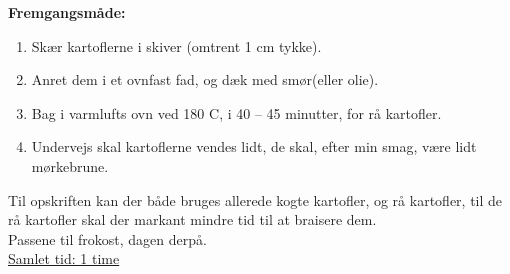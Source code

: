 \documentclass{book}
\begin{document}
\begin{minipage}[t]{0.5\textwidth}
\textbf{Fremgangsmåde:}
\begin{enumerate}
    \item Skær kartoflerne i skiver (omtrent 1 cm tykke).
\item Anret dem i et ovnfast fad, og dæk med smør(eller olie).
\item Bag i varmlufts ovn ved 180 \degree C, i 40 – 45 minutter, for rå kartofler.
\item Undervejs skal kartoflerne vendes lidt, de skal, efter min smag, være lidt mørkebrune.
\end{enumerate}
\end{minipage}
Til opskriften kan der både bruges allerede kogte kartofler, og rå kartofler, til de rå kartofler skal der markant mindre tid til at braisere dem. 
\\ Passene til frokost, dagen derpå.
\\ \underline{Samlet tid: 1 time}
\end{document}
